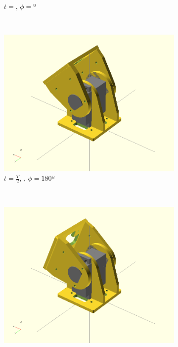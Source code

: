 \begin{figure}[h]
\begin{subfigure}[b]{0.18\textwidth}
                \caption{$t = $, $\phi=º$}
                \label{fig:Gait_osc_offset_67_5-2}
        \end{subfigure}
        ~
        \begin{subfigure}[b]{0.18\textwidth}
         	   \centering
                \includegraphics[width=\textwidth]{images/Gait_osc_offset_45.png}
                \caption{$t = \frac{T}{2}$, , $\phi=180º$}
                \label{fig:Gait_osc_offset_45-2}
        \end{subfigure}
        ~
                \begin{subfigure}[b]{0.18\textwidth}
                \centering
                \includegraphics[width=\textwidth]{images/Gait_osc_offset_22_5.png}

\end{subfigure}
\end{figure}
